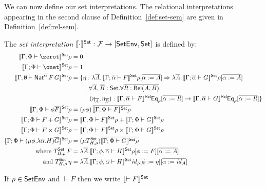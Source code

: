 \documentclass{lmcs}
\theoremstyle{plain}\newtheorem{satz}[thm]{Satz}
\newcommand{\F}{\mathcal{F}}
\newcommand{\set}{\mathsf{Set}}
\renewcommand{\id}{\mathit{id}}
\begin{document}
We can now define our set interpretations.  The relational
interpretations appearing in the second clause of
Definition~\ref{def:set-sem} are given in
Definition~\ref{def:rel-sem}.

\begin{defi}\label{def:set-sem}
The {\em set interpretation} $\setsem{\cdot} : \F \to [\setenv, \set]$
is defined by:
\begin{align*}
  \setsem{\Gamma;\Phi \vdash \zerot}\rho &= 0\\
  \setsem{\Gamma;\Phi \vdash \onet}\rho &= 1\\
  \setsem{\Gamma; \emptyset
    \vdash \Nat^{\ol{\alpha}}
    \,F\,G}\rho &= \{\eta : \lambda \ol{A}. \,\setsem{\Gamma;
    \ol{\alpha} \vdash
    F}\rho[\ol{\alpha := A}] 
      \Rightarrow \lambda \ol{A}.\,\setsem{\Gamma; 
        \ol{\alpha} \vdash G}\rho[\ol{\alpha := A}] \\ 
      &\hspace{0.3in}|~\forall \overline{A}, \overline{B} :
      \set. \forall \overline{R : \rel(A, B)}.\\ 
      &\hspace{0.4in}(\eta_{\overline{A}}, \eta_{\overline{B}})
      : \relsem{\Gamma; \ol{\alpha} \vdash F}\Eq_{\rho}[\ol{\alpha := R}]
      \rightarrow \relsem{\Gamma; \ol{\alpha} \vdash
        G}\Eq_{\rho}[\ol{\alpha := R}] \} \\
  \setsem{\Gamma;\Phi \vdash \phi\ol{F}}\rho &=
  (\rho\phi)\,\ol{\setsem{\Gamma;\Phi \vdash
    F}\rho}\\
  \setsem{\Gamma;\Phi \vdash F+G}\rho &=
  \setsem{\Gamma;\Phi \vdash F}\rho +
  \setsem{\Gamma;\Phi \vdash G}\rho\\
  \setsem{\Gamma;\Phi \vdash F\times G}\rho &=
  \setsem{\Gamma;\Phi \vdash F}\rho \times
  \setsem{\Gamma;\Phi \vdash G}\rho\\ 
  \setsem{\Gamma;\Phi \vdash (\mu \phi.\lambda
    \ol{\alpha}. H)\ol{G}}\rho &= (\mu
    T^\set_{H,\rho})\ol{\setsem{\Gamma;\Phi \vdash G}\rho}\\
    \text{where } T^\set_{H,\rho}\,F & = \lambda
  \ol{A}. \setsem{\Gamma;\phi, \ol{\alpha} \vdash
    H}\rho[\phi :=  F][\ol{\alpha := A}]\\
  \text{and } T^\set_{H,\rho}\,\eta &= \lambda
  \ol{A}. \setsem{\Gamma;\phi, \ol{\alpha} \vdash
    H}\id_\rho[\phi := \eta][\ol{\alpha := \id_{A}}]
\end{align*}
\end{defi}
If $\rho \in \mathsf{SetEnv}$ and $\vdash F$ then we write $\setsem{\vdash F}$
\end{document}
